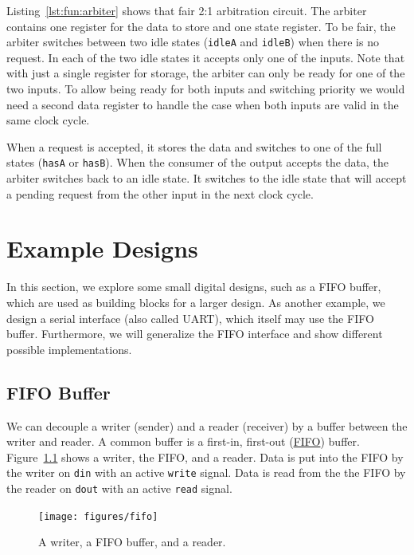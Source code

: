 \documentclass[%
    10pt,
    headinclude, footexclude,
    openright, %
    notitlepage,
    cleardoubleempty,
    headsepline,
    pointlessnumbers,
    bibtotoc, idxtotoc,
    ]{scrbook}
\newcommand{\code}[1]{{\lstinline[basicstyle=\small\ttfamily]{#1}}}
\begin{document}
Listing~\ref{lst:fun:arbiter} shows that fair 2:1 arbitration circuit.
The arbiter contains one register for the data to store and one state register. To be fair, the arbiter
switches between two idle states (\code{idleA} and \code{idleB}) when there is no request.
In each of the two idle states it accepts only one of the inputs. Note that with just a single register for
storage, the arbiter can only be ready for one of the two inputs. To allow being ready for both inputs
and switching priority we would need a second data register to handle the case when both inputs
are valid in the same clock cycle.

When a request is accepted, it stores the data and switches to one of the full states (\code{hasA}
or \code{hasB}).
When the consumer of the output accepts the data, the arbiter switches back to an idle state.
It switches to the idle state that will accept a pending request from the other input
in the next clock cycle.



\chapter{Example Designs}

In this section, we explore some small digital designs, such as
a FIFO buffer, which are used as building blocks for a larger design.
As another example, we design a serial interface (also called UART),
which itself may use the FIFO buffer. Furthermore, we will generalize
the FIFO interface and show different possible implementations.

\section{FIFO Buffer}
\label{sec:fifo}



We can decouple a writer (sender) and a reader (receiver) by a buffer
between the writer and reader.
A common buffer is a first-in, first-out
(\href{https://en.wikipedia.org/wiki/FIFO_%28computing_and_electronics%29}{FIFO})
buffer. Figure~\ref{fig:fifo} shows a writer, the FIFO, and a reader.
Data is put into the FIFO by the writer on \code{din} with an active
\code{write} signal. Data is read from the the FIFO by the reader on
\code{dout} with an active \code{read} signal.

\begin{figure}
  \centering
  \texttt{[image: figures/fifo]}
  \caption{A writer, a FIFO buffer, and a reader.}
  \label{fig:fifo}
\end{figure}
\end{document}
